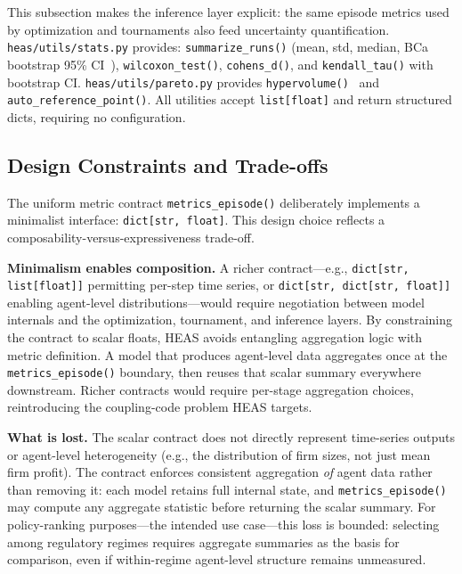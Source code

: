 \documentclass{wscpaperproc}
\begin{document}
This subsection makes the inference layer explicit: the same episode metrics
used by optimization and tournaments also feed uncertainty quantification.
\texttt{heas/utils/stats.py} provides: \texttt{summarize\_runs()} (mean, std,
median, BCa bootstrap 95\% CI~\cite{efron1994bootstrap}),
\texttt{wilcoxon\_test()}, \texttt{cohens\_d()}, and \texttt{kendall\_tau()}
with bootstrap CI. \texttt{heas/utils/pareto.py} provides
\texttt{hypervolume()}~\cite{zitzler1998hypervolume} and
\texttt{auto\_reference\_point()}. All utilities accept \texttt{list[float]}
and return structured dicts, requiring no configuration.

\subsection{Design Constraints and Trade-offs}
\label{sec:design-constraints}

The uniform metric contract \texttt{metrics\_episode()} deliberately implements
a minimalist interface: \texttt{dict[str, float]}. This design choice reflects a
composability-versus-expressiveness trade-off.

\textbf{Minimalism enables composition.} A richer contract---e.g.,
\texttt{dict[str, list[float]]} permitting per-step time series, or
\texttt{dict[str, dict[str, float]]} enabling agent-level distributions---would
require negotiation between model internals and the optimization, tournament, and
inference layers. By constraining the contract to scalar floats, HEAS avoids
entangling aggregation logic with metric definition. A model that produces
agent-level data aggregates once at the \texttt{metrics\_episode()} boundary, then
reuses that scalar summary everywhere downstream. Richer contracts would require
per-stage aggregation choices, reintroducing the coupling-code problem HEAS targets.


\textbf{What is lost.} The scalar contract does not directly represent time-series
outputs or agent-level heterogeneity (e.g., the distribution of firm sizes, not
just mean firm profit). The contract enforces consistent aggregation \emph{of} agent data rather than removing it: each model retains full internal state, and \texttt{metrics\_episode()} may compute any aggregate statistic before returning the scalar summary. For policy-ranking purposes---the intended use case---this
loss is bounded: selecting among regulatory regimes requires aggregate summaries
as the basis for comparison, even if within-regime agent-level structure remains
unmeasured.
\end{document}
